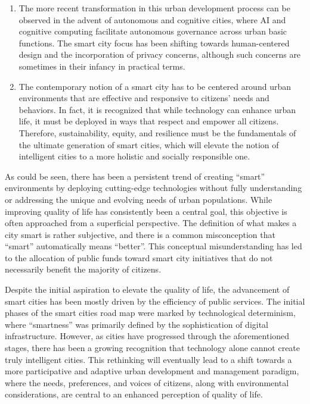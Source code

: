 \documentclass[smartcities,article,submit,pdftex,moreauthors]{Definitions/mdpi}
\begin{document}
\begin{enumerate}
    \item The more recent transformation in this urban development process can be observed in the advent of autonomous and cognitive cities, where AI and cognitive computing facilitate autonomous governance across urban basic functions. The smart city focus has been shifting towards human-centered design and the incorporation of privacy concerns, although such concerns are sometimes in their infancy in practical terms.
    
    \item The contemporary notion of a smart city has to be centered around urban environments that are effective and responsive to citizens' needs and behaviors. In fact, it is recognized that while technology can enhance urban life, it must be deployed in ways that respect and empower all citizens. Therefore, sustainability, equity, and resilience must be the fundamentals of the ultimate generation of smart cities, which will elevate the notion of intelligent cities to a more holistic and socially responsible one.
\end{enumerate}

As could be seen, there has been a persistent trend of creating ``smart'' environments by deploying cutting-edge technologies without fully understanding or addressing the unique and evolving needs of urban populations. While improving quality of life has consistently been a central goal, this objective is often approached from a superficial perspective. The definition of what makes a city smart is rather subjective, and there is a common misconception that ``smart'' automatically means ``better''. This conceptual misunderstanding has led to the allocation of public funds toward smart city initiatives that do not necessarily benefit the majority of citizens.

Despite the initial aspiration to elevate the quality of life, the advancement of smart cities has been mostly driven by the efficiency of public services. The initial phases of the smart cities road map were marked by technological determinism, where ``smartness'' was primarily defined by the sophistication of digital infrastructure. However, as cities have progressed through the aforementioned stages, there has been a growing recognition that technology alone cannot create truly intelligent cities. This rethinking will eventually lead to a shift towards a more participative and adaptive urban development and management paradigm, where the needs, preferences, and voices of citizens, along with environmental considerations, are central to an enhanced perception of quality of life.
\end{document}
